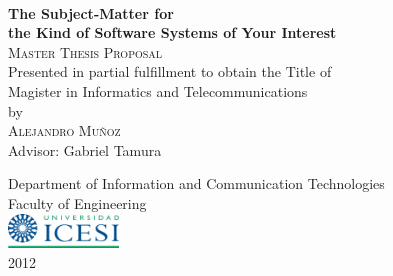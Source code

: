 \documentclass[letterpaper,11pt]{report}
\begin{document}
\begin{titlepage}
\begin{center}

~\\

{ \Huge \textbf{The Subject-Matter for}\\[0.2cm]
\Huge \textbf{the Kind of Software Systems of Your Interest}}\\[3cm]


\textsc{\Large Master Thesis Proposal}\\ [1cm]

Presented in partial fulfillment to obtain the Title of \\
Magister in Informatics and Telecommunications \\[3cm]

by \\[0.5cm]

\textsc{\Large Alejandro Muñoz }\\[1cm]

\large{Advisor:} Gabriel Tamura \\

\vfill

{\Large Department of Information and Communication Technologies}\\[0.3cm]
{\Large Faculty of Engineering}\\[0.5cm]

\includegraphics[width=0.22\textwidth]{logos/logo-icesi.png}\\[0.3cm]

\large 2012\\

\end{center}

\end{titlepage}



\tableofcontents
\listoftables
\listoffigures

\sloppy



\end{document}
